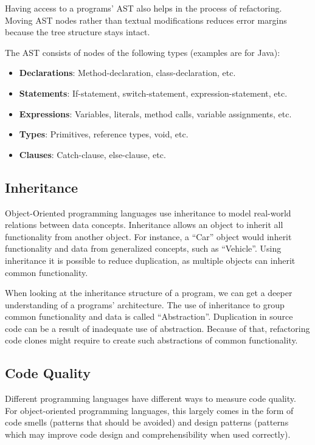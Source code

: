 Having access to a programs' AST also helps in the process of refactoring. Moving AST nodes rather than textual modifications reduces error margins because the tree structure stays intact.

The AST consists of nodes of the following types (examples are for Java):
\begin{itemize}
  \item \textbf{Declarations}: Method-declaration, class-declaration, etc.
  \item \textbf{Statements}: If-statement, switch-statement, expression-statement, etc.
  \item \textbf{Expressions}: Variables, literals, method calls, variable assignments, etc.
  \item \textbf{Types}: Primitives, reference types, void, etc.
  \item \textbf{Clauses}: Catch-clause, else-clause, etc.
\end{itemize}

\subsection{Inheritance}
Object-Oriented programming languages use inheritance to model real-world relations between data concepts. Inheritance allows an object to inherit all functionality from another object. For instance, a ``Car'' object would inherit functionality and data from generalized concepts, such as ``Vehicle''. Using inheritance it is possible to reduce duplication, as multiple objects can inherit common functionality.

When looking at the inheritance structure of a program, we can get a deeper understanding of a programs' architecture. The use of inheritance to group common functionality and data is called ``Abstraction''. Duplication in source code can be a result of inadequate use of abstraction. Because of that, refactoring code clones might require to create such abstractions of common functionality.

\subsection{Code Quality}
Different programming languages have different ways to measure code quality. For object-oriented programming languages, this largely comes in the form of code smells (patterns that should be avoided) and design patterns (patterns which may improve code design and comprehensibility when used correctly).

